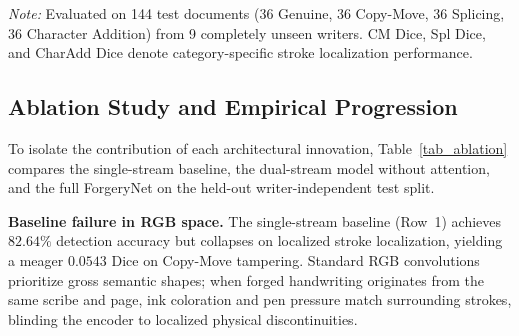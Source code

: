 \documentclass[pdflatex,sn-mathphys-num,iicol]{sn-jnl}
\begin{document}
\begin{table}[t]
\caption{Controlled component ablation on the held-out writer-independent test split (144 document patches from 9 unseen writers). All configurations are trained under identical training protocols and random seeds.}\label{tab_ablation}
\centering
\setlength{\tabcolsep}{4pt}
\vskip3pt
\footnotesize\textit{Note:} Evaluated on 144 test documents (36 Genuine, 36 Copy-Move, 36 Splicing, 36 Character Addition) from 9 completely unseen writers. CM Dice, Spl Dice, and CharAdd Dice denote category-specific stroke localization performance.
\end{table}

\subsection{Ablation Study and Empirical Progression}\label{subsec5_4}
To isolate the contribution of each architectural innovation, Table~\ref{tab_ablation} compares the single-stream baseline, the dual-stream model without attention, and the full ForgeryNet on the held-out writer-independent test split.

\noindent
\textbf{Baseline failure in RGB space.} The single-stream baseline (Row~1) achieves $82.64\%$ detection accuracy but collapses on localized stroke localization, yielding a meager $0.0543$ Dice on Copy-Move tampering. Standard RGB convolutions prioritize gross semantic shapes; when forged handwriting originates from the same scribe and page, ink coloration and pen pressure match surrounding strokes, blinding the encoder to localized physical discontinuities.
\end{document}
